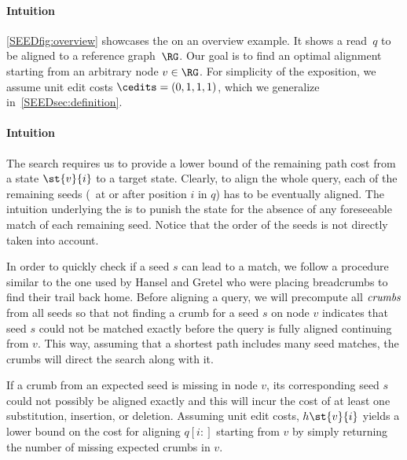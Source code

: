 

\paragraph{Intuition} \label{SEEDsec:overview}
\cref{SEEDfig:overview} showcases the \sh on an overview example. It shows a
read~$q$ to be aligned to a reference graph~$\RG$. Our goal is to find an
optimal alignment starting from an arbitrary node $v \in \RG$.
%
For simplicity of the exposition, we assume unit edit costs $\cedits =
(0,1,1,1)$, which we generalize in~\cref{SEEDsec:definition}.

\paragraph{Intuition}
The \A search requires us to provide a lower bound of the remaining path cost
from a state $\st{v}{i}$ to a target state. Clearly, to align the whole query,
each of the remaining seeds (\ie~at or after position $i$ in $q$) has to be
eventually aligned. The intuition underlying the \sh is to punish the state
for the absence of any foreseeable match of each remaining seed. Notice that the
order of the seeds is not directly taken into account.

In order to quickly check if a seed $s$ can lead to a match, we follow a
procedure similar to the one used by Hansel and Gretel who were placing
breadcrumbs to find their trail back home. Before aligning a query, we will
precompute all $\emph{crumbs}$ from all seeds so that not finding a crumb for
a seed $s$ on node $v$ indicates that seed $s$ could not be matched exactly
before the query is fully aligned continuing from $v$. This way, assuming that a
shortest path includes many seed matches, the crumbs will direct the \A search
along with it.

If a crumb from an expected seed is missing in node $v$, its corresponding seed
$s$ could not possibly be aligned exactly and this will incur the cost of at
least one substitution, insertion, or deletion. Assuming unit edit costs,
$h\st{v}{i}$ yields a lower bound on the cost for aligning $q[i{:}]$ starting
from $v$ by simply returning the number of missing expected crumbs in $v$.

